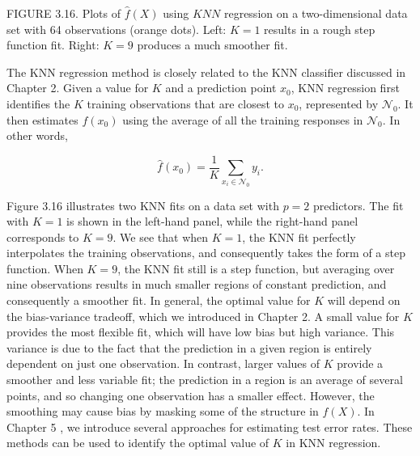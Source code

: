\documentclass[10pt]{article}
\begin{document}
FIGURE 3.16. Plots of $\hat{f}(X)$ using $K N N$ regression on a two-dimensional data set with 64 observations (orange dots). Left: $K=1$ results in a rough step function fit. Right: $K=9$ produces a much smoother fit.

The KNN regression method is closely related to the KNN classifier discussed in Chapter 2. Given a value for $K$ and a prediction point $x_{0}$, KNN regression first identifies the $K$ training observations that are closest to $x_{0}$, represented by $\mathcal{N}_{0}$. It then estimates $f\left(x_{0}\right)$ using the average of all the training responses in $\mathcal{N}_{0}$. In other words,

$$
\hat{f}\left(x_{0}\right)=\frac{1}{K} \sum_{x_{i} \in \mathcal{N}_{0}} y_{i} .
$$

Figure 3.16 illustrates two KNN fits on a data set with $p=2$ predictors. The fit with $K=1$ is shown in the left-hand panel, while the right-hand panel corresponds to $K=9$. We see that when $K=1$, the KNN fit perfectly interpolates the training observations, and consequently takes the form of a step function. When $K=9$, the KNN fit still is a step function, but averaging over nine observations results in much smaller regions of constant prediction, and consequently a smoother fit. In general, the optimal value for $K$ will depend on the bias-variance tradeoff, which we introduced in Chapter 2. A small value for $K$ provides the most flexible fit, which will have low bias but high variance. This variance is due to the fact that the prediction in a given region is entirely dependent on just one observation. In contrast, larger values of $K$ provide a smoother and less variable fit; the prediction in a region is an average of several points, and so changing one observation has a smaller effect. However, the smoothing may cause bias by masking some of the structure in $f(X)$. In Chapter 5 , we introduce several approaches for estimating test error rates. These methods can be used to identify the optimal value of $K$ in KNN regression.
\end{document}
